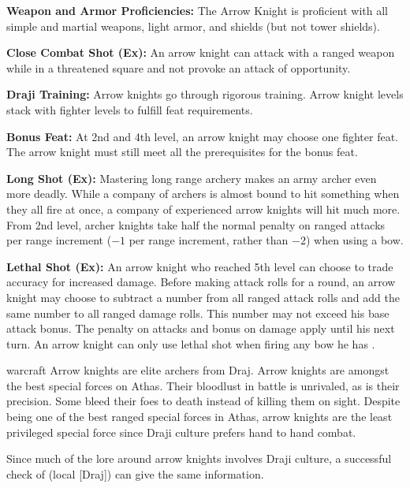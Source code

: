 {
\textbf{Weapon and Armor Proficiencies:} The Arrow Knight is proficient with all simple and martial weapons, light armor, and shields (but not tower shields).

\textbf{Close Combat Shot (Ex):} An arrow knight can attack with a ranged weapon while in a threatened square and not provoke an attack of opportunity.

\textbf{Draji Training:} Arrow knights go through rigorous training. Arrow knight levels stack with fighter levels to fulfill feat requirements.

\textbf{Bonus Feat:} At 2nd and 4th level, an arrow knight may choose one fighter feat. The arrow knight must still meet all the prerequisites for the bonus feat.

\textbf{Long Shot (Ex):} Mastering long range archery makes an army archer even more deadly. While a company of archers is almost bound to hit something when they all fire at once, a company of experienced arrow knights will hit much more. From 2nd level, archer knights take half the normal penalty on ranged attacks per range increment ($-1$ per range increment, rather than $-2$) when using a bow.

\textbf{Lethal Shot (Ex):} An arrow knight who reached 5th level can choose to trade accuracy for increased damage. Before making attack rolls for a round, an arrow knight may choose to subtract a number from all ranged attack rolls and add the same number to all ranged damage rolls. This number may not exceed his base attack bonus. The penalty on attacks and bonus on damage apply until his next turn. An arrow knight can only use lethal shot when firing any bow he has .
}
{}
{warcraft}
{Arrow knights are elite archers from Draj.}
{Arrow knights are amongst the best special forces on Athas. Their bloodlust in battle is unrivaled, as is their precision. Some bleed their foes to death instead of killing them on sight.}
{Despite being one of the best ranged special forces in Athas, arrow knights are the least privileged special force since Draji culture prefers hand to hand combat.}

Since much of the lore around arrow knights involves Draji culture, a successful check of  (local [Draj]) can give the same information.